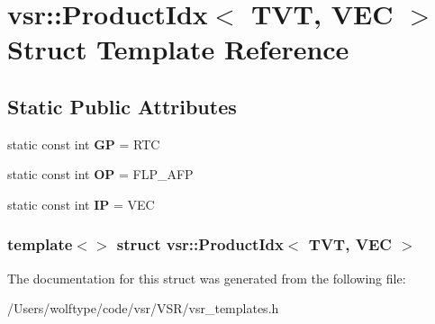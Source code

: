 \hypertarget{structvsr_1_1_product_idx_3_01_t_v_t_00_01_v_e_c_01_4}{\section{vsr\-:\-:Product\-Idx$<$ T\-V\-T, V\-E\-C $>$ Struct Template Reference}
\label{structvsr_1_1_product_idx_3_01_t_v_t_00_01_v_e_c_01_4}
}
\subsection*{Static Public Attributes}
\begin{DoxyCompactItemize}
\item 
\hypertarget{structvsr_1_1_product_idx_3_01_t_v_t_00_01_v_e_c_01_4_ae839312c899e33b3ab36c39009b4044a}{static const int {\bfseries G\-P} = R\-T\-C}\label{structvsr_1_1_product_idx_3_01_t_v_t_00_01_v_e_c_01_4_ae839312c899e33b3ab36c39009b4044a}

\item 
\hypertarget{structvsr_1_1_product_idx_3_01_t_v_t_00_01_v_e_c_01_4_a5f8b1993803dc25bd25b8d87cd852e29}{static const int {\bfseries O\-P} = F\-L\-P\-\_\-\-A\-F\-P}\label{structvsr_1_1_product_idx_3_01_t_v_t_00_01_v_e_c_01_4_a5f8b1993803dc25bd25b8d87cd852e29}

\item 
\hypertarget{structvsr_1_1_product_idx_3_01_t_v_t_00_01_v_e_c_01_4_a79c028eefbb30f206ea2a41b9afb0094}{static const int {\bfseries I\-P} = V\-E\-C}\label{structvsr_1_1_product_idx_3_01_t_v_t_00_01_v_e_c_01_4_a79c028eefbb30f206ea2a41b9afb0094}

\end{DoxyCompactItemize}
\subsubsection*{template$<$$>$ struct vsr\-::\-Product\-Idx$<$ T\-V\-T, V\-E\-C $>$}



The documentation for this struct was generated from the following file\-:\begin{DoxyCompactItemize}
\item 
/\-Users/wolftype/code/vsr/\-V\-S\-R/vsr\-\_\-templates.\-h\end{DoxyCompactItemize}
